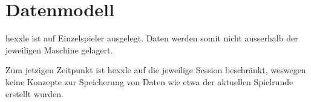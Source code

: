\documentclass[../main.tex]{subfiles}
\begin{document}
	\section{Datenmodell}
	\par \gls{hexxle} ist auf Einzelspieler ausgelegt. Daten werden somit nicht ausserhalb der jeweiligen Maschine gelagert. 
	\par Zum jetzigen Zeitpunkt ist \gls{hexxle} auf die jeweilige Session beschränkt, weswegen keine Konzepte zur Speicherung von Daten wie etwa der aktuellen Spielrunde erstellt wurden.
\end{document}
